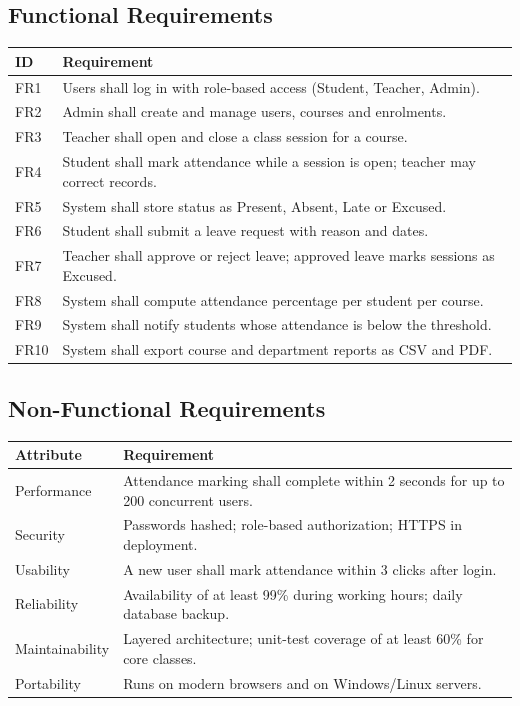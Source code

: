 \documentclass[11pt,a4paper]{article}
\begin{document}
\subsection{Functional Requirements}
\begin{tabularx}{\textwidth}{|l|X|}
\hline
\textbf{ID} & \textbf{Requirement}\\
\hline
FR1 & Users shall log in with role-based access (Student, Teacher, Admin).\\ \hline
FR2 & Admin shall create and manage users, courses and enrolments.\\ \hline
FR3 & Teacher shall open and close a class session for a course.\\ \hline
FR4 & Student shall mark attendance while a session is open; teacher may correct records.\\ \hline
FR5 & System shall store status as Present, Absent, Late or Excused.\\ \hline
FR6 & Student shall submit a leave request with reason and dates.\\ \hline
FR7 & Teacher shall approve or reject leave; approved leave marks sessions as Excused.\\ \hline
FR8 & System shall compute attendance percentage per student per course.\\ \hline
FR9 & System shall notify students whose attendance is below the threshold.\\ \hline
FR10 & System shall export course and department reports as CSV and PDF.\\
\hline
\end{tabularx}

\subsection{Non-Functional Requirements}
\begin{tabularx}{\textwidth}{|l|X|}
\hline
\textbf{Attribute} & \textbf{Requirement}\\
\hline
Performance & Attendance marking shall complete within 2 seconds for up to 200 concurrent users.\\ \hline
Security & Passwords hashed; role-based authorization; HTTPS in deployment.\\ \hline
Usability & A new user shall mark attendance within 3 clicks after login.\\ \hline
Reliability & Availability of at least 99\% during working hours; daily database backup.\\ \hline
Maintainability & Layered architecture; unit-test coverage of at least 60\% for core classes.\\ \hline
Portability & Runs on modern browsers and on Windows/Linux servers.\\
\hline
\end{tabularx}
\end{document}

